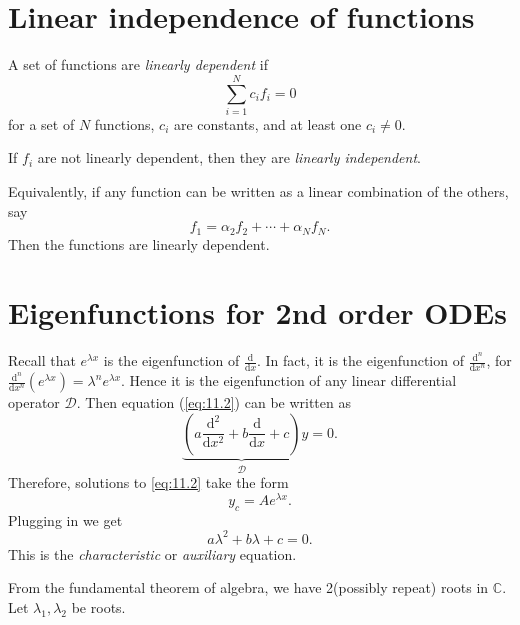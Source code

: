 \documentclass[10pt]{article}
\begin{document}
    \section{Linear independence of functions}
    \begin{definition}
        A set of functions are \textit{linearly dependent} if 
        \begin{equation}\label{eq:11.3}
            \sum_{i=1}^{N} c_if_i=0
        \end{equation}
        for a set of $N$ functions, $c_i$ are constants, and at least one $c_i\neq 0$.

        If $f_i$ are not linearly dependent, then they are \textit{linearly independent}.
    \end{definition}
    Equivalently, if any function can be written as a linear combination of the others, say
    \[
        f_1=\alpha_2 f_2+\cdots+\alpha_N f_N
    .\]
    Then the functions are linearly dependent.
    \section{Eigenfunctions for 2nd order ODEs}
    Recall that $ e^{\lambda x} $ is the eigenfunction of $ \frac{\mathrm{d}}{\mathrm{d}x}  $. In fact, it is the eigenfunction of $ \frac{\mathrm{d}^n}{\mathrm{d}x^n}  $, for $ \frac{\mathrm{d}^n}{\mathrm{d}x^n} (e^{\lambda x})=\lambda^{n}e^{\lambda x} $. Hence it is the eigenfunction of any linear differential operator $ \mathcal{D} $. Then equation (\ref{eq:11.2}) can be written as
    \[
        \underbrace{\left( a\frac{\mathrm{d}^2}{\mathrm{d}x^2}+b \frac{\mathrm{d}}{\mathrm{d}x}+c \right)}_{\mathcal{D}}y=0
    .\]
    Therefore, solutions to \ref{eq:11.2} take the form
    \[
        y_c=Ae^{\lambda x}
    .\]
    Plugging in we get 
    \begin{equation}\label{eq:11.3}
        a\lambda^2+b\lambda+c=0.
    \end{equation}
    This is the \textit{characteristic} or \textit{auxiliary} equation.

    From the fundamental theorem of algebra, we have 2(possibly repeat) roots in $ \mathbb{C} $. Let $ \lambda_1, \lambda_2 $ be roots. 
\end{document}
